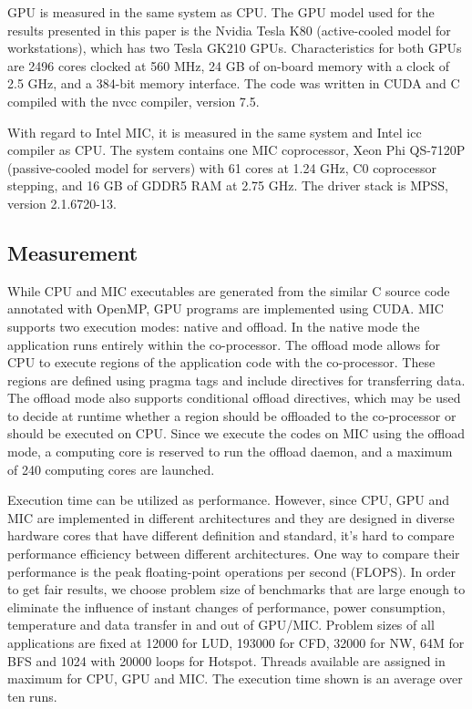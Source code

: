 
 GPU is measured in the same system as CPU. The GPU model used for the results presented in this paper is the Nvidia Tesla K80 (active-cooled model for workstations), which has two Tesla GK210 GPUs. Characteristics for both GPUs are 2496 cores clocked at 560 MHz, 24 GB of on-board memory with a clock of 2.5 GHz, and a 384-bit memory interface. The code was written in CUDA and C compiled with the nvcc compiler, version 7.5. 


With regard to Intel MIC, it is measured in the same system and Intel icc compiler as CPU. The system contains one MIC coprocessor, Xeon Phi QS-7120P (passive-cooled model for servers) with 61 cores at 1.24 GHz, C0 coprocessor stepping, and 16 GB of GDDR5 RAM at 2.75 GHz. The driver stack is MPSS, version 2.1.6720-13. 

\subsection{Measurement}

While CPU and MIC executables are generated from the similar C source code annotated with OpenMP, GPU programs are implemented using CUDA. MIC supports two execution modes: native and offload. In the native mode the application runs entirely within the co-processor. The offload mode allows for CPU to execute regions of the application code with the co-processor. These regions are defined using pragma tags and include directives for transferring data. The offload mode also supports conditional offload directives, which may be used to decide at runtime whether a region should be offloaded to the co-processor or should be executed on CPU. Since we execute the codes on MIC using the offload mode, a computing core is reserved to run the offload daemon, and a maximum of 240 computing cores are launched.

Execution time can be utilized as performance. However, since CPU, GPU and MIC are implemented in different architectures and they are designed in diverse hardware cores that have different definition and standard, it's hard to compare performance efficiency between different architectures. One way to compare their performance is the peak floating-point operations per second (FLOPS). In order to get fair results, we choose problem size of benchmarks that are large enough to eliminate the influence of instant changes of performance, power consumption, temperature and data transfer in and out of GPU/MIC. Problem sizes of all applications are fixed at 12000 for LUD, 193000 for CFD, 32000 for NW, 64M for BFS and 1024 with 20000 loops for Hotspot. Threads available are assigned in maximum for CPU, GPU and MIC. The execution time shown is an average over ten runs.

